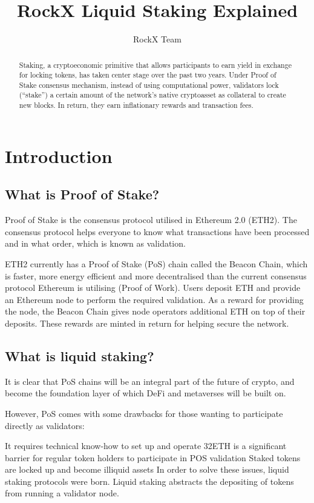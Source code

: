 \documentclass{article}
\title{RockX Liquid Staking Explained}
\author{RockX Team}
\begin{document}
\maketitle

\begin{abstract}
Staking, a cryptoeconomic primitive that allows participants to earn yield in exchange for locking tokens, has taken center stage over the past two years. Under Proof of Stake consensus mechanism, instead of using computational power, validators lock (“stake”) a certain amount of the network’s native cryptoasset as collateral to create new blocks. In return, they earn inflationary rewards and transaction fees.
\end{abstract}

\section{Introduction}

\subsection{What is Proof of Stake?}

Proof of Stake is the consensus protocol utilised in Ethereum 2.0 (ETH2). The consensus protocol helps everyone to know what transactions have been processed and in what order, which is known as validation.

ETH2 currently has a Proof of Stake (PoS) chain called the Beacon Chain, which is faster, more energy efficient and more decentralised than the current consensus protocol Ethereum is utilising (Proof of Work). Users deposit ETH and provide an Ethereum node to perform the required validation. As a reward for providing the node, the Beacon Chain gives node operators additional ETH on top of their deposits. These rewards are minted in return for helping secure the network.

\subsection{What is liquid staking?}

It is clear that PoS chains will be an integral part of the future of crypto, and become the foundation layer of which DeFi and metaverses will be built on.

However, PoS comes with some drawbacks for those wanting to participate directly as validators:

It requires technical know-how to set up and operate
32ETH is a significant barrier for regular token holders to participate in POS validation
Staked tokens are locked up and become illiquid assets
In order to solve these issues, liquid staking protocols were born. Liquid staking abstracts the depositing of tokens from running a validator node.
\end{document}
